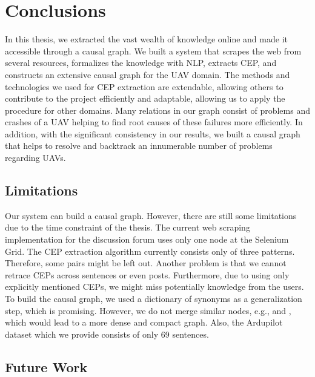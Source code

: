 \chapter{Conclusions}\label{ch:conclusions}
In this thesis, we extracted the vast wealth of knowledge online and made it accessible through a causal graph.
We built a system that scrapes the web from several resources, formalizes the knowledge with \ac{NLP}, extracts \ac{CEP}, and constructs an extensive causal graph for the \ac{UAV} domain.
The methods and technologies we used for \ac{CEP} extraction are extendable, allowing others to contribute to the project efficiently and adaptable, allowing us to apply the procedure for other domains.
Many relations in our graph consist of problems and crashes of a \ac{UAV} helping to find root causes of these failures more efficiently.
In addition, with the significant consistency in our results, we built a causal graph that helps to resolve and backtrack an innumerable number of problems regarding \ac{UAV}s.


\section{Limitations}\label{sec:limitations}

Our system can build a causal graph.
However, there are still some limitations due to the time constraint of the thesis.
The current web scraping implementation for the discussion forum uses only one node at the Selenium Grid.
The \ac{CEP} extraction algorithm currently consists only of three patterns.
Therefore, some pairs might be left out.
Another problem is that we cannot retrace \ac{CEP}s across sentences or even posts.
Furthermore, due to using only explicitly mentioned \ac{CEP}s, we might miss potentially knowledge from the users.
To build the causal graph, we used a dictionary of synonyms as a generalization step, which is promising.
However, we do not merge similar nodes, e.g.,  and , which would lead to a more dense and compact graph.
Also, the Ardupilot dataset which we provide consists of only 69 sentences.


\section{Future Work}\label{sec:future-work}

